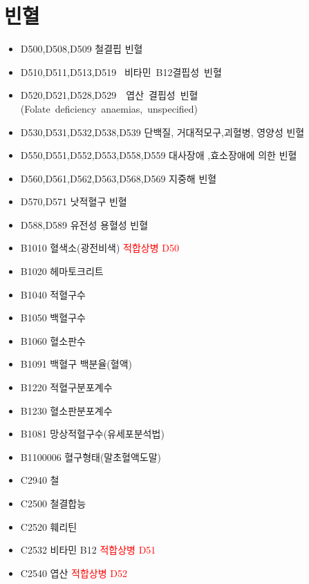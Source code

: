 \section{빈혈}
\myde{}
{
\begin{itemize}\tightlist
\item[\dsjuridical] D500,D508,D509  철결핍 빈혈
\item[\dsjuridical] D510,D511,D513,D519  비타민 B12결핍성 빈혈
\item[\dsjuridical] D520,D521,D528,D529  엽산 결핍성 빈혈(Folate deficiency anaemias, unspecified)
\item[\dsjuridical] D530,D531,D532,D538,D539 단백질, 거대적모구,괴혈병, 영양성 빈혈
\item[\dsjuridical] D550,D551,D552,D553,D558,D559  대사장애 ,효소장애에 의한 빈혈
\item[\dsjuridical] D560,D561,D562,D563,D568,D569  지중해 빈혈
\item[\dsjuridical] D570,D571  낫적혈구 빈혈
\item[\dsjuridical] D588,D589  유전성 용혈성 빈혈
\item[\dschemical] B1010 혈색소(광전비색) \textcolor{red}{적합상병 D50}
\item[\dschemical] B1020 헤마토크리트
\item[\dschemical] B1040 적혈구수
\item[\dschemical] B1050 백혈구수
\item[\dschemical] B1060 혈소판수
\item[\dschemical] B1091 백혈구 백분율(혈액)
\item[\dschemical] B1220 적혈구분포계수
\item[\dschemical] B1230 혈소판분포계수 
\item[\dschemical] B1081 망상적혈구수(유세포분석법)
\item[\dschemical] B1100006 혈구형태(말초혈액도말)
\item[\dschemical] C2940 철
\item[\dschemical] C2500 철결합능
\item[\dschemical] C2520 훼리틴
\item[\dschemical] C2532 비타민 B12 \textcolor{red}{적합상병 D51}
\item[\dschemical] C2540 엽산 \textcolor{red}{적합상병 D52}
\end{itemize}
}
